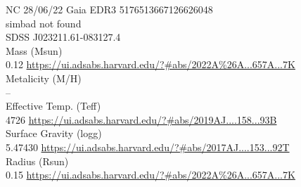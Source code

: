 NC 28/06/22
 Gaia EDR3 5176513667126626048\\
 simbad not found\\
 
SDSS J023211.61-083127.4\\
Mass (Msun)\\
0.12 \url{https://ui.adsabs.harvard.edu/?#abs/2022A%26A...657A...7K}\\
Metalicity (M/H)\\
--\\
Effective Temp. (Teff)\\
4726 \url{https://ui.adsabs.harvard.edu/?#abs/2019AJ....158...93B}\\
Surface Gravity (logg)\\
5.47430 \url{https://ui.adsabs.harvard.edu/?#abs/2017AJ....153...92T}\\
Radius (Rsun)\\
0.15 \url{https://ui.adsabs.harvard.edu/?#abs/2022A%26A...657A...7K}\\